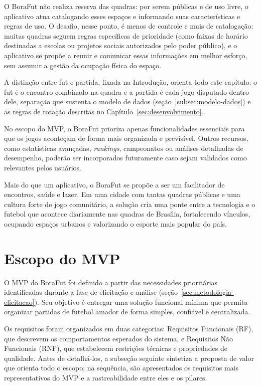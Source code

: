   O BoraFut não realiza reserva das quadras: por serem públicas e de uso livre, o aplicativo atua catalogando esses espaços e informando suas características e regras de uso. O desafio, nesse ponto, é menos de controle e mais de catalogação: muitas quadras seguem regras específicas de prioridade (como faixas de horário destinadas a escolas ou projetos sociais autorizados pelo poder público), e o aplicativo se propõe a reunir e comunicar essas informações em melhor esforço, sem assumir a gestão da ocupação física do espaço.

  A distinção entre fut e partida, fixada na Introdução, orienta todo este capítulo: o fut é o encontro combinado na quadra e a partida é cada jogo disputado dentro dele, separação que sustenta o modelo de dados (seção~\ref{subsec:modelo-dados}) e as regras de rotação descritas no Capítulo~\ref{sec:desenvolvimento}.

  No escopo do MVP, o BoraFut prioriza apenas funcionalidades essenciais para que os jogos aconteçam de forma mais organizada e previsível. Outros recursos, como estatísticas avançadas, \textit{rankings}, campeonatos ou análises detalhadas de desempenho, poderão ser incorporados futuramente caso sejam validados como relevantes pelos usuários.

  Mais do que um aplicativo, o BoraFut se propõe a ser um facilitador de encontros, saúde e lazer. Em uma cidade com tantas quadras públicas e uma cultura forte de jogo comunitário, a solução cria uma ponte entre a tecnologia e o futebol que acontece diariamente nas quadras de Brasília, fortalecendo vínculos, ocupando espaços urbanos e valorizando o esporte mais popular do país.

  \section{Escopo do MVP}
  O MVP do BoraFut foi definido a partir das necessidades prioritárias identificadas durante a fase de elicitação e análise (seção~\ref{sec:metodologia-elicitacao}). Seu objetivo é entregar uma solução funcional mínima que permita organizar partidas de futebol amador de forma simples, confiável e centralizada.

    Os requisitos foram organizados em duas categorias: Requisitos Funcionais (RF), que descrevem os comportamentos esperados do sistema, e Requisitos Não Funcionais (RNF), que estabelecem restrições técnicas e propriedades de qualidade. Antes de detalhá-los, a subseção seguinte sintetiza a proposta de valor que orienta todo o escopo; na sequência, são apresentados os requisitos mais representativos do MVP e a rastreabilidade entre eles e os pilares.

